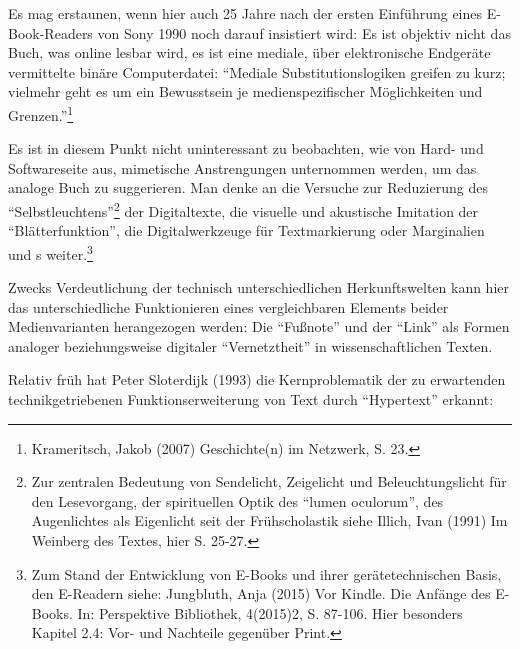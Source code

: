 \documentclass[a4paper,
fontsize=11pt,
oneside,
numbers=noperiodatend,
parskip=half-,
bibliography=totoc,
final
]{scrartcl}
\begin{document}
Es mag erstaunen, wenn hier auch 25 Jahre nach der ersten Einführung
eines E-Book-Readers von Sony 1990 noch darauf insistiert wird: Es ist
objektiv nicht das Buch, was online lesbar wird, es ist eine mediale,
über elektronische Endgeräte vermittelte binäre Computerdatei:
\enquote{Mediale Substitutionslogiken greifen zu kurz; vielmehr geht es
um ein Bewusstsein je medienspezifischer Möglichkeiten und
Grenzen.}\footnote{Krameritsch, Jakob (2007) Geschichte(n) im Netzwerk,
  S. 23.}

Es ist in diesem Punkt nicht uninteressant zu beobachten, wie von Hard-
und Softwareseite aus, mimetische Anstrengungen unternommen werden, um
das analoge Buch zu suggerieren. Man denke an die Versuche zur
Reduzierung des \enquote{Selbstleuchtens}\footnote{Zur zentralen
  Bedeutung von Sendelicht, Zeigelicht und Beleuchtungslicht für den
  Lesevorgang, der spirituellen Optik des \enquote{lumen oculorum}, des
  Augenlichtes als Eigenlicht seit der Frühscholastik siehe Illich, Ivan
  (1991) Im Weinberg des Textes, hier S. 25-27.} der Digitaltexte, die
visuelle und akustische Imitation der \enquote{Blätterfunktion}, die
Digitalwerkzeuge für Textmarkierung oder Marginalien und s
weiter.\footnote{Zum Stand der Entwicklung von E-Books und ihrer
  gerätetechnischen Basis, den E-Readern siehe: Jungbluth, Anja (2015)
  Vor Kindle. Die Anfänge des E-Books. In: Perspektive Bibliothek,
  4(2015)2, S. 87-106. Hier besonders Kapitel 2.4: Vor- und Nachteile
  gegenüber Print.}

Zwecks Verdeutlichung der technisch unterschiedlichen Herkunftswelten
kann hier das unterschiedliche Funktionieren eines vergleichbaren
Elements beider Medienvarianten herangezogen werden: Die
\enquote{Fußnote} und der \enquote{Link} als Formen analoger
beziehungsweise digitaler \enquote{Vernetztheit} in wissenschaftlichen
Texten.

Relativ früh hat Peter Sloterdijk (1993) die Kernproblematik der zu
erwartenden technikgetriebenen Funktionserweiterung von Text durch
\enquote{Hypertext} erkannt:
\end{document}

